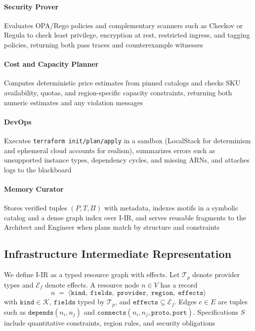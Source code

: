 \documentclass[acmsmall,screen,review,anonymous]{acmart}
\begin{document}
\paragraph{Security Prover}
Evaluates OPA/Rego policies and complementary scanners such as Checkov or Regula to check least privilege, encryption at rest, restricted ingress, and tagging policies, returning both pass traces and counterexample witnesses

\paragraph{Cost and Capacity Planner}
Computes deterministic price estimates from pinned catalogs and checks SKU availability, quotas, and region-specific capacity constraints, returning both numeric estimates and any violation messages

\paragraph{DevOps}
Executes \texttt{terraform init/plan/apply} in a sandbox (LocalStack for determinism and ephemeral cloud accounts for realism), summarizes errors such as unsupported instance types, dependency cycles, and missing ARNs, and attaches logs to the blackboard

\paragraph{Memory Curator}
Stores verified tuples $(P,T,\Pi)$ with metadata, indexes motifs in a symbolic catalog and a dense graph index over I-IR, and serves reusable fragments to the Architect and Engineer when plans match by structure and constraints

\subsection{Infrastructure Intermediate Representation}
\label{sec:iir}

We define I-IR as a typed resource graph with effects. Let $\mathcal{T}_p$ denote provider types and $\mathcal{E}_f$ denote effects. A resource node $n\in V$ has a record
\begin{equation}
n \;=\; \big\langle \texttt{kind},\; \texttt{fields},\; \texttt{provider},\; \texttt{region},\; \texttt{effects} \big\rangle
\end{equation}
with $\texttt{kind} \in \mathcal{K}$, $\texttt{fields}$ typed by $\mathcal{T}_p$, and $\texttt{effects} \subseteq \mathcal{E}_f$. Edges $e\in E$ are tuples such as $\mathtt{depends}(n_i,n_j)$ and $\mathtt{connects}(n_i,n_j,\texttt{proto},\texttt{port})$. Specifications $S$ include quantitative constraints, region rules, and security obligations
\end{document}
